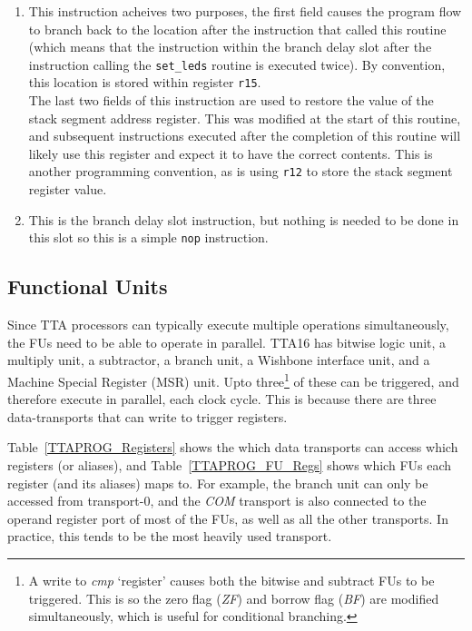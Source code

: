 \begin{enumerate}
  The final field performs the same function as the first line, sets
  \texttt{com} to `1' for use with following instruction.
  \item This instruction acheives two purposes, the first field causes the
  program flow to branch back to the location after the instruction that called
  this routine (which means that the instruction within the branch delay slot
  after the instruction calling the \texttt{set\_leds} routine is executed
  twice). By convention, this location is stored within register \texttt{r15}. \\
  The last two fields of this instruction are used to restore the value of 
 the stack segment address register. This was modified at the start of this
 routine, and subsequent instructions executed after the completion of this
 routine will likely use this register and expect it to have the correct
 contents. This is another programming convention, as is using \texttt{r12} to
 store the stack segment register value.
  \item This is the branch delay slot instruction, but nothing is needed to be
  done in this slot so this is a simple \texttt{nop} instruction.
\end{enumerate}


\subsection{Functional Units}
Since TTA processors can typically execute multiple operations simultaneously,
the FUs need to be able to operate in parallel. TTA16 has bitwise logic unit, a
multiply unit, a subtractor, a branch unit, a Wishbone interface unit, and a
Machine Special Register (MSR) unit. Upto three\footnote{A write to
\textit{cmp} `register' causes both the bitwise and subtract FUs to be
triggered. This is so the zero flag (\textit{ZF}) and borrow flag (\textit{BF})
are modified simultaneously, which is useful for conditional branching.} of
these can be triggered, and therefore execute in parallel, each clock cycle.
This is because there are three data-transports that can write to trigger
registers.

Table~\ref{TTAPROG_Registers} shows the which data transports can
access which registers (or aliases), and Table~\ref{TTAPROG_FU_Regs} shows
which FUs each register (and its aliases) maps to. For example, the branch unit
can only be accessed from transport-0, and the \textit{COM} transport is also
connected to the operand register port of most of the FUs, as well as all the
other transports. In practice, this tends to be the most heavily used transport.

